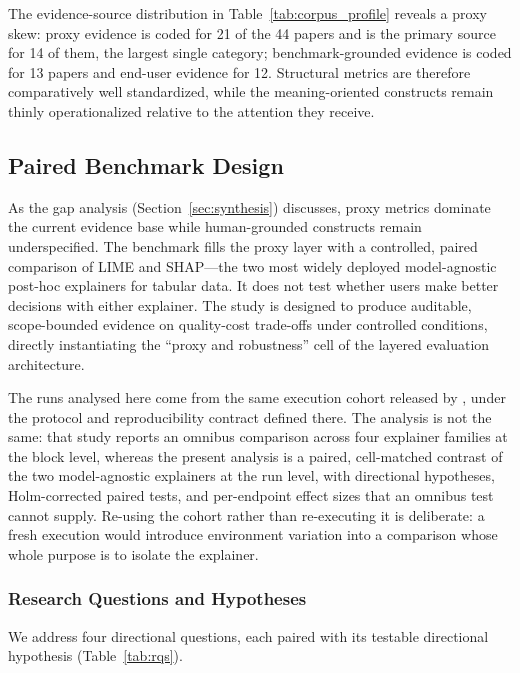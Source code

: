 \documentclass[fleqn,10pt,lineno]{wlpeerj}
\begin{document}
The evidence-source distribution in Table~\ref{tab:corpus_profile}
reveals a proxy skew: proxy evidence is coded for 21 of the 44 papers and is
the primary source for 14 of them, the largest single category; benchmark-grounded
evidence is coded for 13 papers and end-user evidence for 12. Structural metrics
are therefore comparatively well standardized, while the meaning-oriented
constructs remain thinly operationalized relative to the attention they
receive.


\subsection{Paired Benchmark Design}
\label{sec:empirical}

As the gap analysis (Section~\ref{sec:synthesis}) discusses, proxy metrics
dominate the current evidence base while human-grounded constructs remain
underspecified. The benchmark fills the proxy layer with a controlled, paired
comparison of LIME and SHAP---the two most widely deployed
model-agnostic post-hoc explainers for tabular data. It does not test
whether users make better decisions with either explainer. The study is
designed to produce auditable, scope-bounded evidence on quality-cost
trade-offs under controlled conditions, directly instantiating the
``proxy and robustness'' cell of the layered evaluation architecture.

The runs analysed here come from the same execution cohort
released by \citet{herrera2026framework}, under the protocol and
reproducibility contract defined there. The analysis is not the same: that
study reports an omnibus comparison across four explainer families at the
block level, whereas the present analysis is a paired, cell-matched contrast
of the two model-agnostic explainers at the run level, with directional
hypotheses, Holm-corrected paired tests, and per-endpoint effect sizes that
an omnibus test cannot supply. Re-using the cohort rather than re-executing
it is deliberate: a fresh execution would introduce environment variation
into a comparison whose whole purpose is to isolate the explainer.

\subsubsection{Research Questions and Hypotheses}
\label{sec:rqs}

We address four directional questions, each paired with its testable
directional hypothesis (Table~\ref{tab:rqs}).
\end{document}
